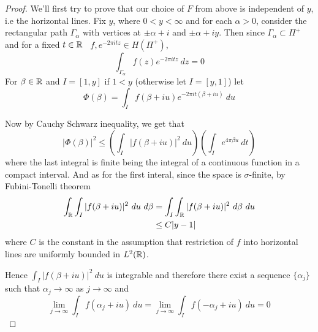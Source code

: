 \begin{proof}
  We'll first try to prove that our choice of $F$ from above is independent of $y$, i.e the horizontal lines.
  Fix $y$, where $0<y< \infty$ and for each $\alpha >0$, consider the rectangular path $\Gamma_\alpha$ with vertices at $\pm \alpha + i$ and $\pm \alpha + iy$. Then since $\Gamma_\alpha \subset \Pi^+$ and for a fixed $t \in \mathbb R$ \ $f, e^{-2\pi itz} \in H(\Pi^+)$, 
  \begin{equation}
    \label{eqn:eqn_holomorphic_stuff}
    \int_{\Gamma_\alpha} f(z)e^{-2\pi itz} \ dz = 0
  \end{equation}
  For $\beta \in \mathbb R$ and $I= [1, y]$ if $1<y$ (otherwise let $I=[y, 1]$) let $$\Phi(\beta) = \int_I f(\beta + iu)e^{-2\pi it(\beta+iu)} \ du$$

  
  Now by Cauchy Schwarz inequality, we get that
  \begin{equation}
    |\Phi(\beta)|^2 \le \left(\int_I |f(\beta+iu)|^2 \ du \right)\left(\int_I e^{4\pi \beta u} \ dt \right)
    \label{eqn:lets_see_abtthis_eqn}
  \end{equation}
  where the last integral is finite being the integral of a continuous function in a compact interval. And as for the first interal, since the space is $\sigma$-finite, by Fubini-Tonelli theorem
  \begin{align*}
    \int_\mathbb R \int_I |f(\beta + iu)|^2 \ du \ d\beta &= \int_I \int_\mathbb R |f(\beta + iu)|^2 \ d\beta \ du \\
    & \le C|y-1| 
  \end{align*}
  where $C$ is the constant in the assumption that restriction of $f$ into horizontal lines are uniformly bounded in $L^2(\mathbb R)$.

  Hence $\int_I |f(\beta+iu)|^2 \ du$ is integrable and therefore there exist a sequence $\{\alpha_j\}$ such that $\alpha_j \to \infty$ as $j \to \infty$ and
  \begin{equation}
  \label{eqn:some_blah_blah_blah}
  \lim_{j \to \infty} \int_I f(\alpha_j + iu) \ du = \lim_{j \to \infty} \int_I f(-\alpha_j + iu) \ du = 0
  \end{equation}
 

\end{proof}

